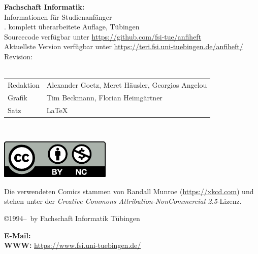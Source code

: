 \thispagestyle{empty}

\textbf{Fachschaft Informatik:}\\
Informationen für Studienanfänger\\
\number\auflage. komplett überarbeitete Auf\/lage, Tübingen \number\jahr\\[0.2cm]
{\footnotesize Sourcecode verfügbar unter \url{https://github.com/fsi-tue/anfiheft}\\
               Aktuellste Version verfügbar unter \url{https://teri.fsi.uni-tuebingen.de/anfiheft/}\\
               Revision: \gitCommit\\[1cm]}
\medskip \\

\begin{tabular}{ll}
	Redaktion & Alexander Goetz, Meret Häusler, Georgios Angelou \\ %
	Grafik & Tim Beckmann, Florian Heimgärtner \\
	Satz & \LaTeX
\end{tabular}\\

\vfill
\begin{minipage}[c]{0.1\textwidth}
	\includegraphics[width=\linewidth]{info/logos/by-nc.pdf}
\end{minipage}
\begin{minipage}[c]{0.9\textwidth}
	Die verwendeten Comics stammen von Randall Munroe (\url{https://xkcd.com}) und stehen unter der \emph{Creative Commons Attribution-NonCommercial 2.5}-Lizenz.
\end{minipage}

\copyright 1994--\number\jahr ~by Fachschaft Informatik Tübingen\\

\medskip

\textbf{E-Mail:} \hfill
{}\\
\textbf{WWW:} \hfill
\url{https://www.fsi.uni-tuebingen.de/}
\newpage
